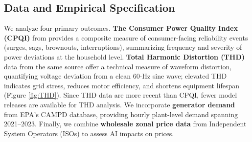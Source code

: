 \documentclass[a4paper,fleqn,longmktitle]{cas-sc}
\theoremstyle{plain}
\theoremstyle{definition}
\begin{document}

\subsection{Data and Empirical Specification}
We analyze four primary outcomes. \textbf{The Consumer Power Quality Index (CPQI)} from \cite{WhiskerLabs_THD_2024} provides a composite measure of consumer-facing reliability events (surges, sags, brownouts, interruptions), summarizing frequency and severity of power deviations at the household level. \textbf{Total Harmonic Distortion (THD)} data from the same source offer a technical measure of waveform distortion, quantifying voltage deviation from a clean 60-Hz sine wave; elevated THD indicates grid stress, reduces motor efficiency, and shortens equipment lifespan (Figure \ref{fig:THD}). Since THD data are more recent than CPQI, fewer model releases are available for THD analysis. We incorporate \textbf{generator demand} from EPA's CAMPD database, providing hourly plant-level demand spanning 2021–2023. Finally, we combine \textbf{wholesale zonal price data} from Independent System Operators (ISOs) to assess AI impacts on prices.
\end{document}

